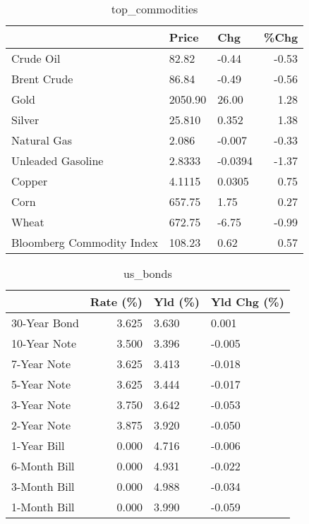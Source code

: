 \documentclass{article}%
\begin{document}
\begin{table}[htbp]%
\caption{top\_commodities}%
\centering%
\begin{adjustbox}{width=1\textwidth}%
\begin{tabular}{lllr}
\toprule
                          &   Price &     Chg &  \%Chg \\
\midrule
               Crude Oil  &   82.82 &   -0.44 & -0.53 \\
             Brent Crude  &   86.84 &   -0.49 & -0.56 \\
                    Gold  & 2050.90 &   26.00 &  1.28 \\
                  Silver  &  25.810 &   0.352 &  1.38 \\
             Natural Gas  &   2.086 &  -0.007 & -0.33 \\
       Unleaded Gasoline  &  2.8333 & -0.0394 & -1.37 \\
                  Copper  &  4.1115 &  0.0305 &  0.75 \\
                    Corn  &  657.75 &    1.75 &  0.27 \\
                   Wheat  &  672.75 &   -6.75 & -0.99 \\
Bloomberg Commodity Index &  108.23 &    0.62 &  0.57 \\
\bottomrule
\end{tabular}
%
\end{adjustbox}%
\end{table}

%


\begin{table}[htbp]%
\caption{us\_bonds}%
\centering%
\begin{adjustbox}{width=1\textwidth}%
\begin{tabular}{lrll}
\toprule
             &  Rate (\%) & Yld (\%) & Yld Chg (\%) \\
\midrule
30-Year Bond &     3.625 &   3.630 &       0.001 \\
10-Year Note &     3.500 &   3.396 &      -0.005 \\
 7-Year Note &     3.625 &   3.413 &      -0.018 \\
 5-Year Note &     3.625 &   3.444 &      -0.017 \\
 3-Year Note &     3.750 &   3.642 &      -0.053 \\
 2-Year Note &     3.875 &   3.920 &      -0.050 \\
 1-Year Bill &     0.000 &   4.716 &      -0.006 \\
6-Month Bill &     0.000 &   4.931 &      -0.022 \\
3-Month Bill &     0.000 &   4.988 &      -0.034 \\
1-Month Bill &     0.000 &   3.990 &      -0.059 \\
\bottomrule
\end{tabular}
%
\end{adjustbox}%
\end{table}
\end{document}
